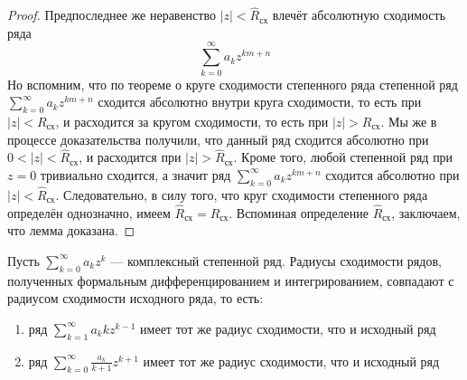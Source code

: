 \documentclass[11pt]{article}
\begin{document}
\begin{proof}
    Предпоследнее же неравенство $\left\lvert z \right\rvert < \widehat{R}_{\text{сх}}$ влечёт абсолютную сходимость ряда 
    \[\displaystyle \sum_{k = 0}^{\infty} a_k z^{km + n}\]
    Но вспомним, что по теореме о круге сходимости степенного ряда степенной ряд $\displaystyle \sum_{k = 0}^{\infty} a_k z^{km + n}$ сходится абсолютно внутри круга сходимости, то есть при $\left\lvert z \right\rvert < R_{\text{сх}}$, и расходится за кругом сходимости, то есть при $\left\lvert z \right\rvert > R_{\text{сх}}$. Мы же в процессе доказательства получили, что данный ряд сходится абсолютно при $0 < \left\lvert z \right\rvert < \widehat{R}_{\text{сх}}$, и расходится при $\left\lvert z \right\rvert > \widehat{R}_\text{сх}$. Кроме того, любой степенной ряд при $z = 0$ тривиально сходится, а значит ряд $\displaystyle \sum_{k = 0}^{\infty} a_k z^{km + n}$ сходится абсолютно при $\left\lvert z \right\rvert < \widehat{R}_{\text{сх}}$. Следовательно, в силу того, что круг сходимости степенного ряда определён однозначно, имеем $\widehat{R}_{\text{сх}} = R_{\text{сх}}$. Вспоминая определение $\widehat{R}_{\text{сх}}$, заключаем, что лемма доказана.
\end{proof}

\begin{theorem} \label{th:1.1}
    Пусть $\displaystyle \sum_{k = 0}^{\infty} a_k z^k$ --- комплексный степенной ряд. Радиусы сходимости рядов, полученных формальным дифференцированием и интегрированием, совпадают с радиусом сходимости исходного ряда, то есть:
    \begin{enumerate}
        \item ряд $\displaystyle \sum_{k = 1}^{\infty} a_k k z^{k - 1}$ имеет тот же радиус сходимости, что и исходный ряд
        \item ряд $\displaystyle \sum_{k = 0}^{\infty} \frac{a_k}{k + 1} z^{k + 1}$ имеет тот же радиус сходимости, что и исходный ряд
    \end{enumerate}
\end{theorem}
\end{document}
